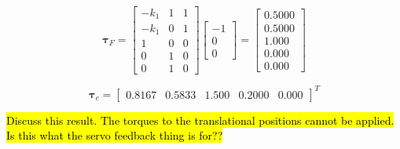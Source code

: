 \begin{equation}
    \boldsymbol{\tau}_F = 
    \begin{bmatrix}
       -k_1 & 1 & 1\\
       -k_1 & 0 & 1\\
       1 & 0 & 0\\
       0 & 1 & 0\\
       0 & 1 & 0
    \end{bmatrix}
    \begin{bmatrix}
        -1 \\ 0 \\ 0
    \end{bmatrix}=
    \begin{bmatrix}
       0.5000\\
       0.5000\\
       1.000\\
       0.000\\
       0.000
    \end{bmatrix}
\end{equation}

\begin{equation}
    \boldsymbol{\tau}_c =
    \begin{bmatrix}
        0.8167 & 0.5833 & 1.500 & 0.2000 & 0.000
    \end{bmatrix}^T
\end{equation}

\hl{Discuss this result. The torques to the translational positions cannot be applied. Is this what the servo feedback thing is for??}